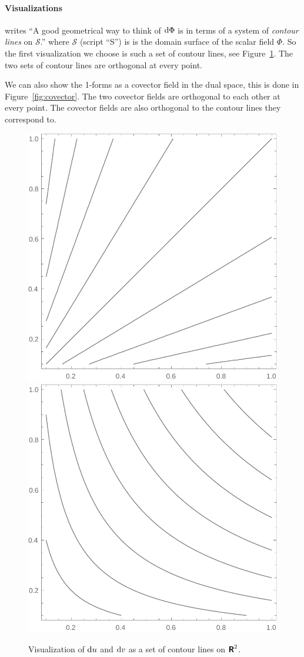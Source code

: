 \documentclass[11pt, english, fleqn, DIV=15, headinclude, BCOR=1cm]{scrartcl}
\begin{document}
\paragraph{Visualizations}

\Textcite[189]{penrose-road_to_reality} writes “A good geometrical way to think
of $\mathop{}\!\mathrm d \Phi$ is in terms of a system of \emph{contour lines} on $\mathscr
S$.” where $\mathscr S$ (script “S”) is is the domain surface of the scalar
field $\Phi$. So the first visualization we choose is such a set of contour
lines, see Figure~\ref{fig:contour}. The two sets of contour lines are
orthogonal at every point.

We can also show the 1-forms as a covector field in the dual space, this is
done in Figure~\ref{fig:covector}. The two covector fields are orthogonal to
each other at every point. The covector fields are also orthogonal to the
contour lines they correspond to.

\begin{figure}[htbp]
    \centering
    \includegraphics[width=.45\linewidth]{contour_u.pdf}
    \hfill
    \includegraphics[width=.45\linewidth]{contour_v.pdf}
    \caption{%
        Visualization of $\mathop{}\!\mathrm d u$ and $\mathop{}\!\mathrm d v$ as a set of contour lines on
        $\text{\bfseries\sffamily R}^2$.
    }
    \label{fig:contour}
\end{figure}
\end{document}
